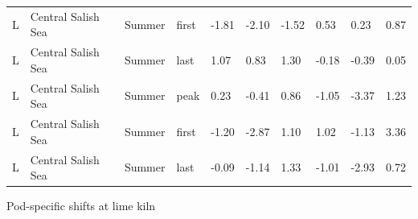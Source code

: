 \documentclass{article}
\begin{document}
\begin{table}[ht]
\begin{tabular}{|p{}|p{}|p{}|p{}|p{}p{}p{}|p{}p{}p{}|}
  L & Central Salish Sea & Summer & first & -1.81 & -2.10 & -1.52 & 0.53 & 0.23 & 0.87 \\ 
  L & Central Salish Sea & Summer & last & 1.07 & 0.83 & 1.30 & -0.18 & -0.39 & 0.05 \\ 
  L & Central Salish Sea & Summer & peak & 0.23 & -0.41 & 0.86 & -1.05 & -3.37 & 1.23 \\ 
  L & Central Salish Sea & Summer & first & -1.20 & -2.87 & 1.10 & 1.02 & -1.13 & 3.36 \\ 
  L & Central Salish Sea & Summer & last & -0.09 & -1.14 & 1.33 & -1.01 & -2.93 & 0.72 \\ 
   \hline
\end{tabular}
\endgroup
\end{table}

\par Pod-specific shifts at lime kiln
\end{document}
